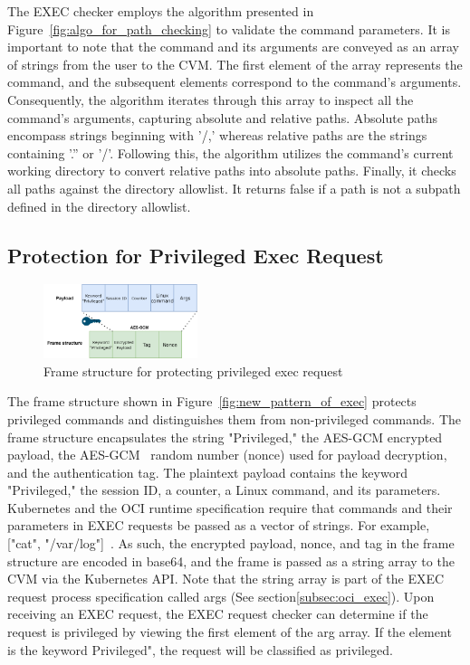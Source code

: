 The EXEC checker employs the algorithm presented in Figure~\ref{fig:algo_for_path_checking} to validate the command parameters. It is important to note that the command and its arguments are conveyed as an array of strings from the user to the \acrshort{CVM}. The first element of the array represents the command, and the subsequent elements 
correspond to the command's arguments. Consequently, the algorithm iterates through this array to inspect all the command's arguments, capturing absolute and relative paths. Absolute paths encompass strings beginning with '/,' whereas relative paths are the strings containing '.'' or '/'. Following 
this, the algorithm utilizes the command's current working directory to convert relative paths into absolute paths. Finally, it checks all paths against the directory allowlist. It returns false if a path is not a subpath defined in the directory allowlist.


\subsection{Protection for Privileged Exec Request}
\label{sec:design_prptect_privileged_request}
\begin{figure}[!htb]
    \centering
    \includegraphics[width=0.4\textwidth]{images/exec_frame.png}
    \caption[Frame structure  for protecting privileged exec request]{Frame structure  for protecting privileged exec request}
    \label{fig:exec_frame}
\end{figure}
The frame structure shown in Figure~\ref{fig:new_pattern_of_exec} protects privileged commands and distinguishes them from non-privileged commands. The frame structure encapsulates the string "Privileged," the AES-GCM encrypted payload, the AES-GCM~\cite*{aes_gcm} random number (nonce) used for payload decryption, and the authentication tag. 
The plaintext payload contains the keyword "Privileged," the session ID, a counter,  a Linux command, and its parameters. Kubernetes and the OCI runtime specification require that commands and their parameters in EXEC requests be passed as a vector of strings. For example, ["cat", "/var/log"]~\cite*{k8s}. As such, 
the encrypted payload, nonce, and tag in the frame structure are encoded in base64, and the frame is passed as a string array to the \acrshort{CVM} via the Kubernetes API. Note that the string array is part of the EXEC request process specification called args (See section\ref{subsec:oci_exec}). Upon receiving an EXEC request, 
the EXEC request checker can determine if the request is privileged by viewing the first element of the arg array. If the element is the keyword Privileged", the request will be classified as privileged.

